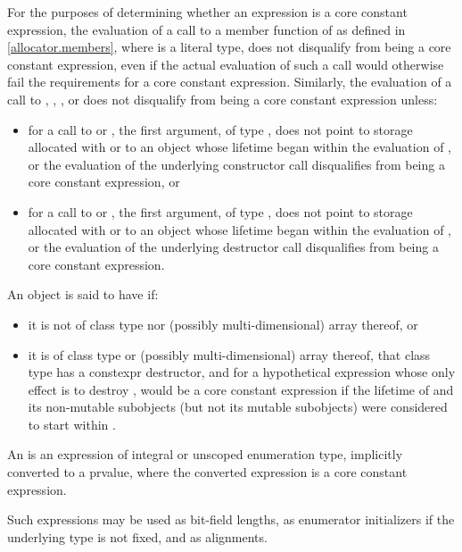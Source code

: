 \pnum
For the purposes of determining
whether an expression  is a core constant expression,
the evaluation of a call to a member function of 
as defined in \ref{allocator.members}, where  is a literal type,
does not disqualify  from being a core constant expression,
even if the actual evaluation of such a call
would otherwise fail the requirements for a core constant expression.
Similarly, the evaluation of a call to
,
,
, or
does not disqualify 
from being a core constant expression unless:
\begin{itemize}
\item
  for a call to  or ,
  the first argument, of type ,
  does not point
  to storage allocated with  or
  to an object whose lifetime began within the evaluation of , or
  the evaluation of the underlying constructor call
  disqualifies  from being a core constant expression, or
\item
  for a call to  or ,
  the first argument, of type ,
  does not point
  to storage allocated with  or
  to an object whose lifetime began within the evaluation of , or
  the evaluation of the underlying destructor call
  disqualifies  from being a core constant expression.
\end{itemize}

\pnum
An object  is said to have  if:
\begin{itemize}
\item
  it is not of class type nor (possibly multi-dimensional) array thereof, or
\item
  it is of class type or (possibly multi-dimensional) array thereof,
  that class type has a constexpr destructor, and
  for a hypothetical expression 
  whose only effect is to destroy ,
   would be a core constant expression
  if the lifetime of  and its non-mutable subobjects
  (but not its mutable subobjects) were considered to start within .
\end{itemize}

\pnum
An 
is an expression of integral or
unscoped enumeration type, implicitly converted to a prvalue, where the converted expression is a core constant expression.
\begin{note}
Such expressions may be
used as bit-field lengths, as enumerator
initializers if the underlying type is not fixed,
and as alignments.
\end{note}

